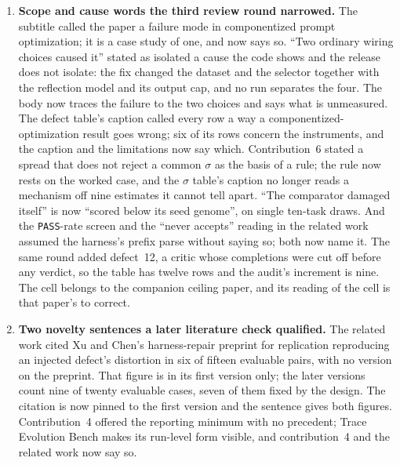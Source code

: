 \documentclass[11pt]{article}
\begin{document}
\begin{enumerate}
    turning out to read $\sigma$ too: the
    contamination was moving them all along, and the count of what it moves is bounded by the
    count of what is watched. The pair has moved nine times for that reason and not once because
    the contamination changed. The body used to carry this history; it now states the current
    pair and the bound, and the history lives here.
  \item \textbf{Scope and cause words the third review round narrowed.} The subtitle called the
    paper a failure mode in componentized prompt optimization; it is a case study of one, and now
    says so. ``Two ordinary wiring choices caused it'' stated as isolated a cause the code shows
    and the release does not isolate: the fix changed the dataset and the selector together with
    the reflection model and its output cap, and no run separates the four. The body now traces
    the failure to the two choices and says what is unmeasured. The defect table's caption called
    every row a way a componentized-optimization result goes wrong; six of its rows concern the
    instruments, and the caption and the limitations now say which. Contribution~6 stated a
    spread that does not reject a common $\sigma$ as the basis of a rule; the rule now rests on the
    worked case, and the $\sigma$ table's caption no longer reads a mechanism off nine estimates
    it cannot tell apart. ``The comparator damaged itself'' is now ``scored below its seed
    genome'', on single ten-task draws. And the \texttt{PASS}-rate screen and the
    ``never accepts'' reading in the related work assumed the harness's prefix parse without saying
    so; both now name it. The same round added defect~12, a critic whose completions were cut off
    before any verdict, so the table has twelve rows and the audit's increment is nine. The cell
    belongs to the companion ceiling paper, and its reading of the cell is that paper's to correct.
  \item \textbf{Two novelty sentences a later literature check qualified.} The related work cited
    Xu and Chen's harness-repair preprint for replication reproducing an injected defect's distortion in six
    of fifteen evaluable pairs, with no version on the preprint. That figure is in its first
    version only; the later versions count nine of twenty evaluable cases, seven of them fixed by
    the design. The citation is now pinned to the first version and the sentence gives both
    figures. Contribution~4 offered the reporting minimum with no precedent; Trace Evolution Bench
    makes its run-level form visible, and contribution~4 and the related work
    now say so.
\end{enumerate}
\end{document}
